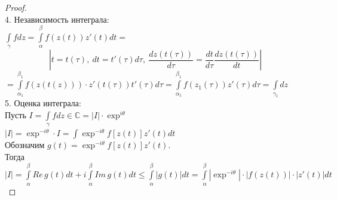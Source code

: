 \begin{proof}
    \ \\
    4. Независимость интеграла:\\
    $\int\limits_{\gamma}  fdz = \int\limits_{\alpha}^{\beta} f(z(t))z'(t)dt =$\[
    \left | 
    t=t(\tau), \ 
    dt=t'(\tau)d\tau, \ 
    \frac{dz(t(\tau))}{d\tau} = \frac{dt}{d\tau}\frac{dz(t(\tau))}{dt}
    \right |    
    \]
    $ = \int\limits_{\alpha_1}^{\beta_1} f(z(t(z))) \cdot z'(t(\tau))t'(\tau)d\tau = \int\limits_{\alpha_1}^{\beta_1} f(z_1(\tau))z'(\tau)d\tau = \int\limits_{\gamma_1}dz$\\
    5. Оценка интеграла:\\
    Пусть $I=\int\limits_{\gamma} fdz \in \mathbb{C} = |I|\cdot \exp^{i\theta}$\\
    $|I|=\exp^{-i\theta}\cdot I = \int\exp^{-i\theta}f[z(t)]z'(t)dt$\\
    Обозначим $g(t) = \exp^{-i\theta}f[z(t)]z'(t)$.\\
    Тогда $|I| = \int\limits_{\alpha}^{\beta} Re \, g(t)dt+i\int\limits_{\alpha}^{\beta} Im \,g(t)dt\leq \int\limits_{\alpha}^{\beta}|g(t)|dt=\int\limits_{\alpha}^{\beta}|\exp^{-i\theta}|\cdot |f(z(t))|\cdot |z'(t)|dt$
\end{proof}
